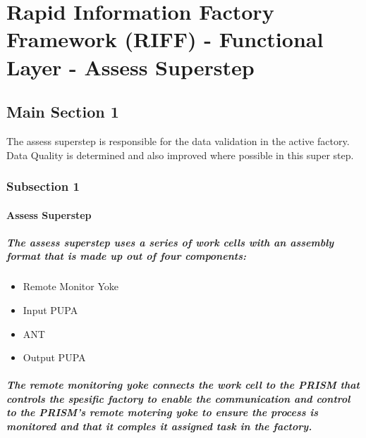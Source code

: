 
\chapter{Rapid Information Factory Framework (RIFF) - Functional Layer - Assess Superstep} %

\label{Chapter12} %



\section{Main Section 1}

The assess superstep is responsible for the data validation in the active factory. Data Quality is determined and also improved where possible in this super step.

\subsection{Subsection 1}

\subsubsection{Assess Superstep}
\paragraph{The assess superstep uses a series of work cells with an assembly format that is made up out of four components:}
\begin{itemize}
\item{Remote Monitor Yoke}
\item{Input PUPA}
\item{ANT}
\item{Output PUPA}
\end{itemize}
\paragraph{The remote monitoring yoke connects the work cell to the PRISM that controls the spesific factory to enable the communication and control to the PRISM's remote motering yoke to ensure the process is monitored and that it comples it assigned task in the factory.}
